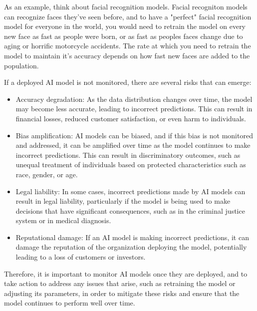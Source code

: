 As an example, think about facial recognition models. Facial recogniton models can recognize faces they've seen before, and to have a "perfect" facial recognition model for everyone in the world, you would need to retrain the model on every new face as fast as people were born, or as fast as peoples faces change due to aging or horrific motorcycle accidents. The rate at which you need to retrain the model to maintain it's accuracy depends on how fast new faces are added to the population.

If a deployed AI model is not monitored, there are several risks that can emerge:

\begin{itemize}
\item Accuracy degradation: As the data distribution changes over time, the model may become less accurate, leading to incorrect predictions. This can result in financial losses, reduced customer satisfaction, or even harm to individuals.
\item Bias amplification: AI models can be biased, and if this bias is not monitored and addressed, it can be amplified over time as the model continues to make incorrect predictions. This can result in discriminatory outcomes, such as unequal treatment of individuals based on protected characteristics such as race, gender, or age.
\item Legal liability: In some cases, incorrect predictions made by AI models can result in legal liability, particularly if the model is being used to make decisions that have significant consequences, such as in the criminal justice system or in medical diagnosis.
\item Reputational damage: If an AI model is making incorrect predictions, it can damage the reputation of the organization deploying the model, potentially leading to a loss of customers or investors.
\end{itemize}

Therefore, it is important to monitor AI models once they are deployed, and to take action to address any issues that arise, such as retraining the model or adjusting its parameters, in order to mitigate these risks and ensure that the model continues to perform well over time.

